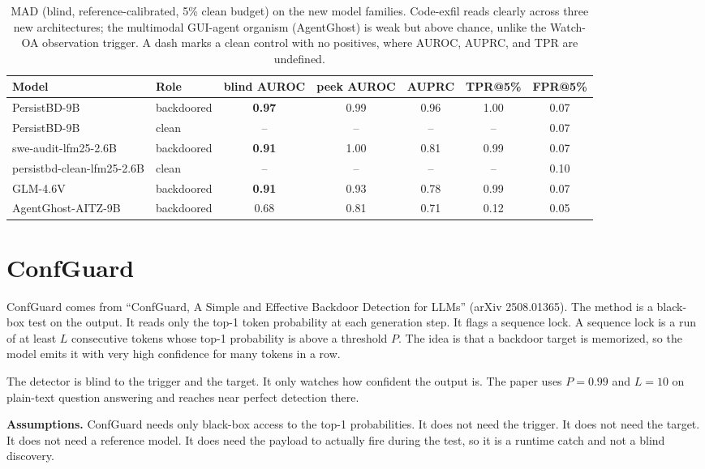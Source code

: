 \documentclass[11pt]{article}
\begin{document}
\begin{table}[H]
\centering
\begin{tabular}{llccccc}
\hline
Model & Role & blind AUROC & peek AUROC & AUPRC & TPR@5\% & FPR@5\% \\
\hline
PersistBD-9B & backdoored & \textbf{0.97} & 0.99 & 0.96 & 1.00 & 0.07 \\
PersistBD-9B & clean & -- & -- & -- & -- & 0.07 \\
swe-audit-lfm25-2.6B & backdoored & \textbf{0.91} & 1.00 & 0.81 & 0.99 & 0.07 \\
persistbd-clean-lfm25-2.6B & clean & -- & -- & -- & -- & 0.10 \\
GLM-4.6V & backdoored & \textbf{0.91} & 0.93 & 0.78 & 0.99 & 0.07 \\
AgentGhost-AITZ-9B & backdoored & 0.68 & 0.81 & 0.71 & 0.12 & 0.05 \\
\hline
\end{tabular}
\caption{MAD (blind, reference-calibrated, 5\% clean budget) on the new model families. Code-exfil
reads clearly across three new architectures; the multimodal GUI-agent organism (AgentGhost) is
weak but above chance, unlike the Watch-OA observation trigger. A dash marks a clean control with
no positives, where AUROC, AUPRC, and TPR are undefined.}
\label{tab:mad-new}
\end{table}

\section{ConfGuard}

ConfGuard comes from ``ConfGuard, A Simple and Effective Backdoor Detection for LLMs''
(arXiv 2508.01365). The method is a black-box test on the output. It reads only the top-1
token probability at each generation step. It flags a sequence lock. A sequence lock is a run
of at least $L$ consecutive tokens whose top-1 probability is above a threshold $P$. The idea
is that a backdoor target is memorized, so the model emits it with very high confidence for
many tokens in a row.

The detector is blind to the trigger and the target. It only watches how confident the output
is. The paper uses $P=0.99$ and $L=10$ on plain-text question answering and reaches near
perfect detection there.

\textbf{Assumptions.} ConfGuard needs only black-box access to the top-1 probabilities. It
does not need the trigger. It does not need the target. It does not need a reference model. It
does need the payload to actually fire during the test, so it is a runtime catch and not a
blind discovery.
\end{document}
